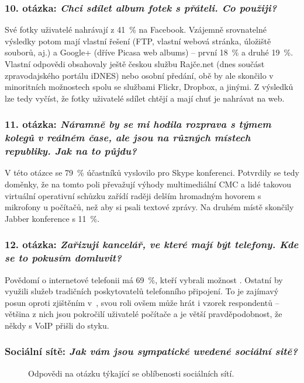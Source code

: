 \documentclass[12pt,oneside,final]{fithesis2}
\begin{document}
\subsubsection*{\textbf{10. otázka:} \emph{Chci sdílet album fotek s přáteli. Co použiji?}}
Své fotky uživatelé nahrávají z 41~\% na Facebook. Vzájemně srovnatelné výsledky potom mají vlastní řešení (FTP, vlastní webová stránka, úložiště souborů, aj.) a Google+ (dříve Picasa web albums) -- první 18~\% a druhé 19~\%. Vlastní odpovědi obsahovaly ještě českou službu Rajče.net (dnes součást zpravodajského portálu iDNES) nebo osobní předání, obě by ale skončilo v minoritních možnostech spolu se službami Flickr, Dropbox, a jinými. Z výsledků lze tedy vyčíst, že fotky uživatelé sdílet chtějí a mají chuť je nahrávat na web.

\subsubsection*{\textbf{11. otázka:} \emph{Náramně by se mi hodila rozprava s týmem kolegů v reálném čase, ale jsou na různých místech republiky. Jak na to půjdu?}}
V této otázce se 79~\% účastníků vyslovilo pro Skype konferenci. Potvrdily se tedy doměnky, že na tomto poli převažují výhody multimediální CMC a lidé takovou virtuální operativní schůzku zařídí raději delším hromadným hovorem s mikrofony u počítačů, než aby si psali textové zprávy. Na druhém místě skončily Jabber konference s 11~\%.

\subsubsection*{\textbf{12. otázka:} \emph{Zařizuji kancelář, ve které mají být telefony. Kde se to pokusím domluvit?}}
Povědomí o internetové telefonii má 69~\%, kteří vybrali možnost . Ostatní by využili služeb tradičních poskytovatelů telefonního připojení. To je zajímavý posun oproti zjištěním v~\cite{latif2007adoption}, svou roli ovšem může hrát i vzorek respondentů -- většina z nich jsou pokročilí uživatelé počítače a je větší pravděpodobnost, že někdy s VoIP přišli do styku.

\subsubsection*{\textbf{Sociální sítě:} \emph{Jak vám jsou sympatické uvedené sociální sitě?}}
\begin{figure}[H]
    \centering


    \caption{Odpovědi na otázku týkající se oblíbenosti sociálních sítí.}
\end{figure}
\end{document}
